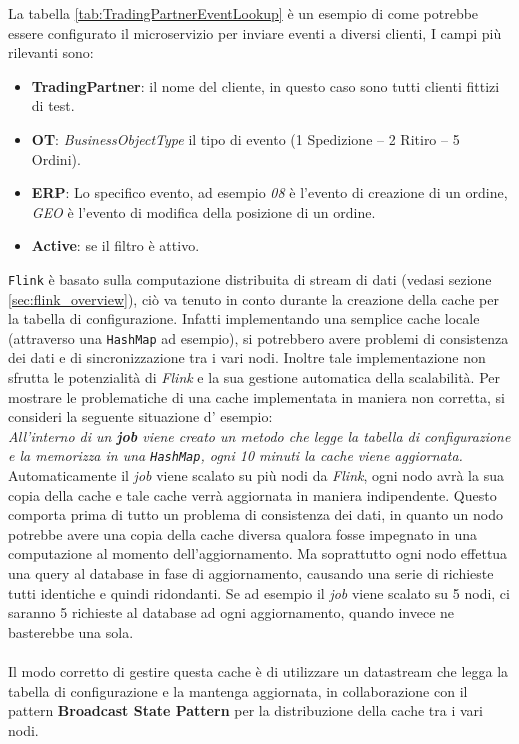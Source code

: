 La tabella \ref{tab:TradingPartnerEventLookup} è un esempio di come potrebbe essere configurato il microservizio per inviare eventi a diversi clienti, I campi più rilevanti sono:
\begin{itemize}
    \item \textbf{TradingPartner}: il nome del cliente, in questo caso sono tutti clienti fittizi di test.
    \item \textbf{OT}: \textit{BusinessObjectType} il tipo di evento (1 Spedizione – 2 Ritiro – 5 Ordini).
    \item \textbf{ERP}: Lo specifico evento, ad esempio \textit{08} è l'evento di creazione di un ordine, \textit{GEO} è l'evento di modifica della posizione di un ordine.
    \item \textbf{Active}: se il filtro è attivo.
\end{itemize}
\texttt{Flink} è basato sulla computazione distribuita di stream di dati (vedasi sezione \ref{sec:flink_overview}),
ciò va tenuto in conto durante la creazione della cache per la tabella di configurazione. 
Infatti implementando una semplice cache locale (attraverso una \texttt{HashMap} ad esempio), si potrebbero avere problemi di consistenza dei dati e di sincronizzazione tra i vari nodi.
Inoltre tale implementazione non sfrutta le potenzialità di \textit{Flink} e la sua gestione automatica della scalabilità.
Per mostrare le problematiche di una cache implementata in maniera non corretta, si consideri la seguente situazione d' esempio:\\
\textit{All'interno di un \textbf{job}  viene creato un metodo che legge la tabella di configurazione e la memorizza in una \texttt{HashMap}, ogni 10 minuti la cache viene aggiornata.}\\
Automaticamente il \textit{job} viene scalato su più nodi da \textit{Flink}, ogni nodo avrà la sua copia della cache e tale cache verrà aggiornata in maniera indipendente.
Questo comporta prima di tutto un problema di consistenza dei dati, in quanto un nodo potrebbe avere una copia della cache diversa 
qualora fosse impegnato in una computazione al momento dell'aggiornamento.
Ma soprattutto ogni nodo effettua una query al database in fase di aggiornamento, causando una serie di richieste tutti identiche e quindi ridondanti.
Se ad esempio il \textit{job} viene scalato su 5 nodi, ci saranno 5 richieste al database ad ogni aggiornamento, quando invece ne basterebbe una sola.\\\\
Il modo corretto di gestire questa cache è di utilizzare un datastream che legga la tabella di configurazione e la mantenga aggiornata, in collaborazione con il pattern 
\textbf{Broadcast State Pattern} per la distribuzione della cache tra i vari nodi.

